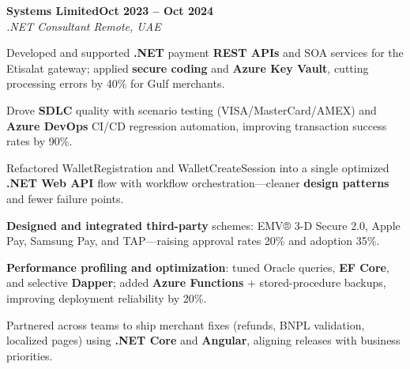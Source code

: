 \documentclass[letterpaper,10pt]{article}
\newcommand{\headingBf}[2]{
  \hspace{10pt}\textbf{#1}\hfill\textbf{#2}\\
}
\newcommand{\headingIt}[2]{
  \hspace{10pt}\textit{#1}\hfill\textit{#2}\\
}
\newenvironment{resume_list}{
  \vspace{-7pt}
  \begin{itemize}[itemsep=-2px, parsep=1pt, leftmargin=30pt]
}{
  \end{itemize}
}
\begin{document}
\headingBf{Systems Limited}{Oct 2023 -- Oct 2024}
\headingIt{.NET Consultant \hfill Remote, UAE}{}
\begin{resume_list}
    \item Developed and supported \textbf{.NET} payment \textbf{REST APIs} and SOA services for the Etisalat gateway; applied \textbf{secure coding} and \textbf{Azure Key Vault}, cutting processing errors by 40\% for Gulf merchants.
    \item Drove \textbf{SDLC} quality with scenario testing (VISA/MasterCard/AMEX) and \textbf{Azure DevOps} CI/CD regression automation, improving transaction success rates by 90\%.
    \item Refactored WalletRegistration and WalletCreateSession into a single optimized \textbf{.NET Web API} flow with workflow orchestration---cleaner \textbf{design patterns} and fewer failure points.
    \item \textbf{Designed and integrated third-party} schemes: EMV® 3-D Secure 2.0, Apple Pay, Samsung Pay, and TAP---raising approval rates 20\% and adoption 35\%.
    \item \textbf{Performance profiling and optimization}: tuned Oracle queries, \textbf{EF Core}, and selective \textbf{Dapper}; added \textbf{Azure Functions} + stored-procedure backups, improving deployment reliability by 20\%.
    \item Partnered across teams to ship merchant fixes (refunds, BNPL validation, localized pages) using \textbf{.NET Core} and \textbf{Angular}, aligning releases with business priorities.
\end{resume_list}
\end{document}

